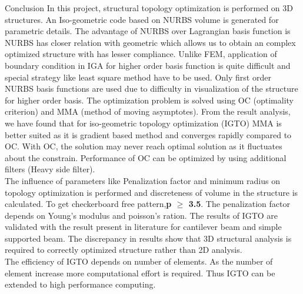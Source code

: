 \documentclass[a4paper,12pt,times]{article}
\begin{document}
\begin{section}{Conclusion}
In this project, structural topology optimization is performed on 3D structures. An Iso-geometric code based on NURBS volume is generated for parametric details. The advantage of NURBS over Lagrangian basis function is NURBS has closer relation with geometric which allows us to obtain an complex optimized structure with has lesser compliance. Unlike FEM, application of boundary condition in IGA for higher order basis function is quite difficult and special strategy like least square method have to be used. Only first order NURBS basis functions are used due to difficulty in visualization of the structure for higher order basis. The optimization problem is solved using OC (optimality criterion) and MMA (method of moving asymptotes). From the result analysis, we have found that for iso-geometric topology optimization (IGTO) MMA is better suited as it is gradient based method and converges rapidly compared to OC. With OC, the solution may never reach optimal solution as it fluctuates about the constrain. Performance of OC can be optimized by using additional filters (Heavy side filter).\\
The influence of parameters like Penalization factor and minimum radius on topology optimization is performed and discreteness of volume in the structure is calculated. To get checkerboard free pattern,\textbf{p $\geq$ 3.5}. The penalization factor depends on Young's modulus and poisson's ration. The results of IGTO are validated with the result present in literature\citep{ISOtop} for cantilever beam and simple supported beam. The discrepancy in results show that 3D structural analysis is required to correctly optimized structure rather than 2D analysis.\\
The efficiency of IGTO depends on number of elements. As the number of element increase more computational effort is required. Thus IGTO can be extended to high performance computing.
\end{section}
\newpage
\end{document}
